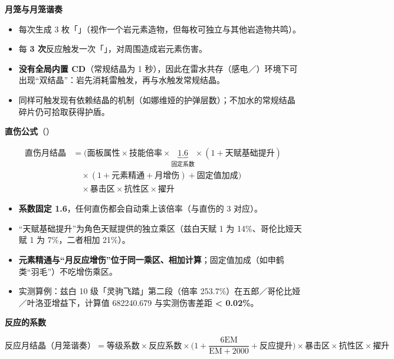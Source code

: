 \indent\textbf{月笼与月笼谐奏} 

\begin{itemize}
\item 每次生成 3 枚「」（视作一个岩元素造物，但每枚可独立与其他岩造物共鸣）。
\item 每 \textbf{3 次}反应触发一次「」，对周围造成岩元素伤害。
\item \textbf{没有全局内置 CD}（常规结晶为 1 秒），因此在雷水共存（感电／）环境下可出现“双结晶”：岩先消耗雷触发，再与水触发常规结晶。
\item {}同样可触发现有依赖结晶的机制（如娜维娅的护弹层数）；不加水的常规结晶碎片仍可拾取获得护盾。
\end{itemize}

\indent\textbf{直伤公式}（）

\[
\begin{aligned}
\text{直伤月结晶} &= \big(\text{面板属性} \times \text{技能倍率} \times \underbrace{1.6}_{\text{固定系数}} \times (1 + \text{天赋基础提升}) \\
&\quad \times (1 + \text{元素精通} + \text{月增伤}) + \text{固定值加成}\big) \\
&\quad \times \text{暴击区} \times \text{抗性区} \times \text{擢升}
\end{aligned}
\]


\begin{itemize}
\item \textbf{系数固定 1.6}，任何直伤都会自动乘上该倍率（与直伤的 3 对应）。
\item “天赋基础提升”为角色天赋提供的独立乘区（兹白天赋 1 为 14\%、哥伦比娅天赋 1 为 7\%，二者相加 21\%）。
\item \textbf{元素精通与“月反应增伤”位于同一乘区、相加计算}；固定值加成（如申鹤类“羽毛”）不吃增伤乘区。
\item 实测算例：兹白 10 级「灵驹飞踏」第二段（倍率 253.7\%）在五郎／哥伦比娅／叶洛亚增益下，计算值 682240.679 与实测伤害差距 \textbf{< 0.02\%}。
\end{itemize}

\indent\textbf{反应的系数}

\[
\text{反应月结晶（月笼谐奏）} = \text{等级系数} \times \text{反应系数} \times \Big(1 + \frac{6\text{EM}}{\text{EM}+2000} + \text{反应提升}\Big) \times \text{暴击区} \times \text{抗性区} \times \text{擢升}
\]


